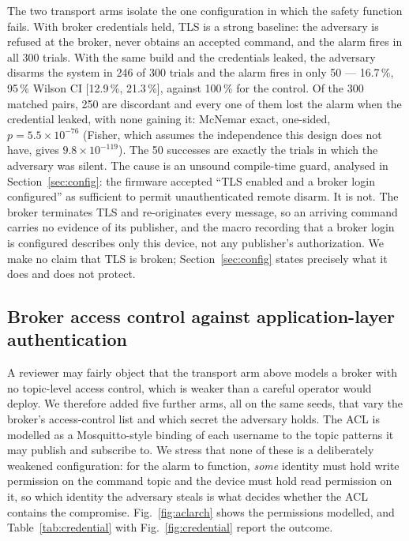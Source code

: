 The two transport arms isolate the one configuration in which the safety function fails. With
broker credentials held, TLS is a strong baseline: the adversary is refused at the broker, never
obtains an accepted command, and the alarm fires in all 300 trials. With the same build and the
credentials leaked, the adversary disarms the system in 246 of 300 trials and the alarm fires in
only 50 --- 16.7\,\%, 95\,\% Wilson CI [12.9\,\%, 21.3\,\%], against 100\,\% for the control.
Of the 300 matched pairs, 250 are discordant and every one of them lost the alarm when the
credential leaked, with none gaining it: McNemar exact, one-sided, $p = 5.5\times10^{-76}$
(Fisher, which assumes the independence this design does not have, gives
$9.8\times10^{-119}$). The 50 successes are exactly the trials in
which the adversary was silent. The cause is an unsound compile-time guard, analysed in
Section~\ref{sec:config}: the firmware accepted ``TLS enabled and a broker login configured'' as
sufficient to permit unauthenticated remote disarm. It is not. The broker terminates TLS and
re-originates every message, so an arriving command carries no evidence of its publisher, and the
macro recording that a broker login is configured describes only this device, not any publisher's
authorization. We make no claim that TLS is broken; Section~\ref{sec:config} states precisely what
it does and does not protect.

\subsection{Broker access control against application-layer authentication}
\label{sec:acl}

A reviewer may fairly object that the transport arm above models a broker with no topic-level
access control, which is weaker than a careful operator would deploy. We therefore added five
further arms, all on the same seeds, that vary the broker's access-control list and which
secret the adversary holds. The ACL is modelled as a Mosquitto-style binding of each username
to the topic patterns it may publish and subscribe to. We stress that none of these is a
deliberately weakened configuration: for the alarm to function, \emph{some} identity must hold
write permission on the command topic and the device must hold read permission on it, so which
identity the adversary steals is what decides whether the ACL contains the compromise.
Fig.~\ref{fig:aclarch} shows the permissions modelled, and Table~\ref{tab:credential} with
Fig.~\ref{fig:credential} report the outcome.

